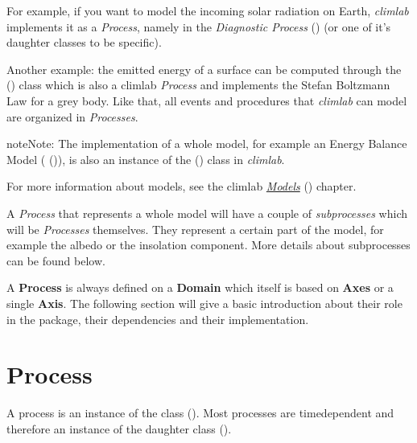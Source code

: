 \documentclass[a4paper,10pt,english]{sphinxmanual}
\begin{document}
For example, if you want to model the incoming solar radiation on Earth, \emph{climlab} implements it as a \emph{Process}, namely in the \emph{Diagnostic Process} {\hyperref[api/climlab.radiation:climlab.radiation.insolation._Insolation]{\emph{}}} () (or one of it's daughter classes to be specific).

Another example: the emitted energy of a surface can be computed through  the {\hyperref[api/climlab.radiation:climlab.radiation.Boltzmann.Boltzmann]{\emph{}}} () class which is also a climlab \emph{Process} and implements the Stefan Boltzmann Law for a grey body. Like that, all events and procedures that \emph{climlab} can model are organized in \emph{Processes}.

\begin{notice}{note}{Note:}
The implementation of a whole model, for example an Energy Balance Model ({\hyperref[api/climlab.model:climlab.model.ebm.EBM]{\emph{}}} ()), is also an instance of the {\hyperref[api/climlab.process:climlab.process.process.Process]{\emph{}}} () class in \emph{climlab}.

For more information about models, see the climlab {\hyperref[models:models]{\emph{Models}}} () chapter.
\end{notice}

A \emph{Process} that represents a whole model will have a couple of \emph{subprocesses} which will be \emph{Processes} themselves. They represent a certain part of the model, for example the albedo or the insolation component. More details about subprocesses can be found below.

A \textbf{Process} is always defined on a \textbf{Domain} which itself is based on \textbf{Axes} or a single \textbf{Axis}. The following section will give a basic introduction about their role in the package, their dependencies and their implementation.


\section{Process}
\label{architecture:process}\label{architecture:process-architecture}
A process is an instance of the class {\hyperref[api/climlab.process:climlab.process.process.Process]{\emph{}}} (). Most processes are timedependent and therefore an instance of the daughter class {\hyperref[api/climlab.process:climlab.process.time_dependent_process.TimeDependentProcess]{\emph{}}} ().
\end{document}
